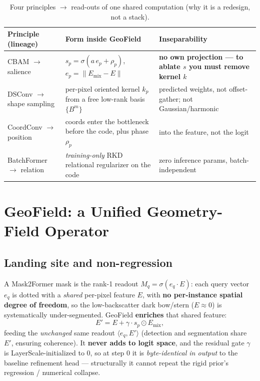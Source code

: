 \documentclass[11pt,a4paper]{article}
\begin{document}
\begin{table}[h]\centering\small
\caption{Four principles $\to$ read-outs of one shared computation (why it is a redesign, not a stack).}
\label{tab:principle}
\renewcommand{\arraystretch}{1.15}
\begin{tabular}{>{\raggedright\arraybackslash}p{2.7cm}>{\raggedright\arraybackslash}p{6.3cm}>{\raggedright\arraybackslash}p{4.6cm}}
\toprule
Principle (lineage) & Form inside GeoField & Inseparability \\
\midrule
CBAM $\to$ salience & $s_p=\sigma(a\,e_p+\rho_p)$, $e_p=\lVert E_{\text{mix}}-E\rVert$ & \textbf{no own projection --- to ablate $s$ you must remove kernel $k$} \\
DSConv $\to$ shape sampling & per-pixel oriented kernel $k_p$ from a free low-rank basis $\{B^m\}$ & predicted weights, not offset-gather; not Gaussian/harmonic \\
CoordConv $\to$ position & coords enter the bottleneck before the code, plus phase $\rho_p$ & into the feature, not the logit \\
BatchFormer $\to$ relation & \emph{training-only} RKD relational regularizer on the code & zero inference params, batch-independent \\
\bottomrule
\end{tabular}
\end{table}

\section{GeoField: a Unified Geometry-Field Operator}
\subsection{Landing site and non-regression}
A Mask2Former mask is the rank-1 readout $M_q=\sigma(e_q\!\cdot\!E)$: each query vector $e_q$ is dotted
with a \emph{shared} per-pixel feature $E$, with \textbf{no per-instance spatial degree of freedom}, so
the low-backscatter dark bow/stern ($E\!\approx\!0$) is systematically under-segmented. GeoField
\textbf{enriches} that shared feature:
\begin{equation}
E' = E + \gamma\cdot s_p \odot E_{\text{mix}},
\end{equation}
feeding the \emph{unchanged} same readout $\langle e_q, E'\rangle$ (detection and segmentation share
$E'$, ensuring coherence). It \textbf{never adds to logit space}, and the residual gate $\gamma$ is
LayerScale-initialized to $0$, so at step 0 it is \emph{byte-identical in output} to the baseline
refinement head --- structurally it cannot repeat the rigid prior's regression / numerical collapse.
\end{document}
